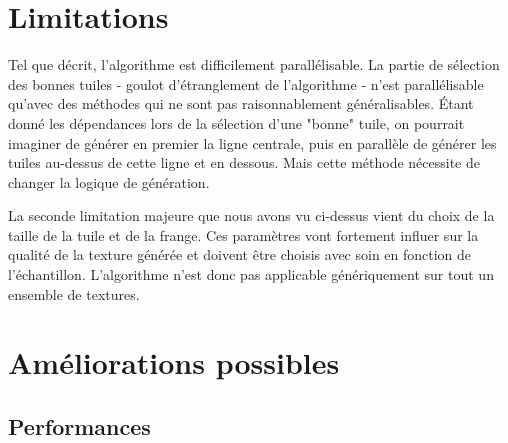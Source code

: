 \documentclass{article}
\begin{document}
% 
% 

\section{Limitations}

Tel que décrit, l'algorithme est difficilement parallélisable. La partie de sélection des bonnes tuiles - goulot d'étranglement de l'algorithme - n'est parallélisable qu'avec des méthodes qui ne sont pas raisonnablement généralisables. Étant donné les dépendances lors de la sélection d'une "bonne" tuile, on pourrait imaginer de générer en premier la ligne centrale, puis en parallèle de générer les tuiles au-dessus de cette ligne et en dessous. Mais cette méthode nécessite de changer la logique de génération.

La seconde limitation majeure que nous avons vu ci-dessus vient du choix de la taille de la tuile et de la frange. Ces paramètres vont fortement influer sur la qualité de la texture générée et doivent être choisis avec soin en fonction de l'échantillon. L'algorithme n'est donc pas applicable génériquement sur tout un ensemble de textures. 


%

\section{Améliorations possibles}

\subsection{Performances}
\end{document}
